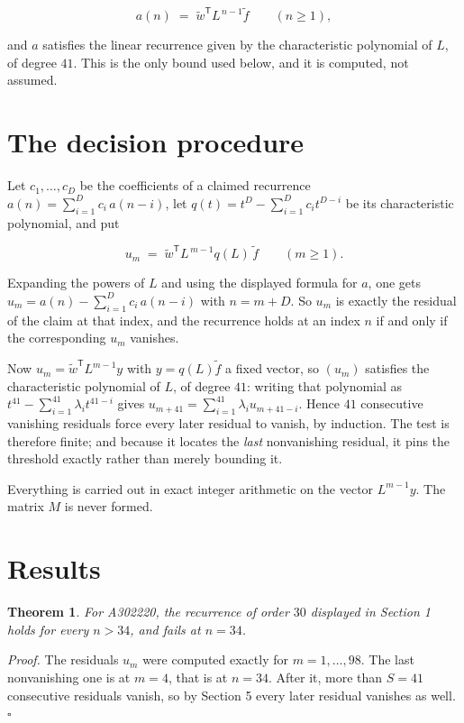 \documentclass[11pt]{article}
\newtheorem{theorem}{Theorem}
\theoremstyle{definition}
\begin{document}
\[a(n) \;=\; \tilde w^{\mathsf T} L^{\,n-1} \tilde f \qquad (n \ge 1),\]

and $a$ satisfies the linear recurrence given by the characteristic polynomial of $L$, of degree $41$. This is the only bound used below, and it is computed, not assumed.

\section{The decision procedure}

Let $c_1,\dots,c_D$ be the coefficients of a claimed recurrence $a(n) = \sum_{i=1}^{D} c_i\,a(n-i)$, let $q(t) = t^{D} - \sum_{i=1}^{D} c_i t^{D-i}$ be its characteristic polynomial, and put

\[u_m \;=\; \tilde w^{\mathsf T} L^{\,m-1} q(L)\,\tilde f \qquad (m \ge 1).\]

Expanding the powers of $L$ and using the displayed formula for $a$, one gets $u_m = a(n) - \sum_{i=1}^{D} c_i\,a(n-i)$ with $n = m + D$. So $u_m$ is exactly the residual of the claim at that index, and the recurrence holds at an index $n$ if and only if the corresponding $u_m$ vanishes.

Now $u_m = \tilde w^{\mathsf T} L^{m-1} y$ with $y = q(L)\tilde f$ a fixed vector, so $(u_m)$ satisfies the characteristic polynomial of $L$, of degree $41$: writing that polynomial as $t^{41} - \sum_{i=1}^{41} \lambda_i t^{41-i}$ gives $u_{m+41} = \sum_{i=1}^{41} \lambda_i u_{m+41-i}$. Hence $41$ consecutive vanishing residuals force every later residual to vanish, by induction. The test is therefore finite; and because it locates the {\itshape last} nonvanishing residual, it pins the threshold exactly rather than merely bounding it.

Everything is carried out in exact integer arithmetic on the vector $L^{m-1}y$. The matrix $M$ is never formed.

\section{Results}

\begin{theorem} For A302220, the recurrence of order $30$ displayed in Section 1 holds for every $n > 34$, and fails at $n = 34$.\end{theorem}

{\itshape Proof.} The residuals $u_m$ were computed exactly for $m = 1,\dots,98$. The last nonvanishing one is at $m = 4$, that is at $n = 34$. After it, more than $S = 41$ consecutive residuals vanish, so by Section 5 every later residual vanishes as well. $\square$
\end{document}
